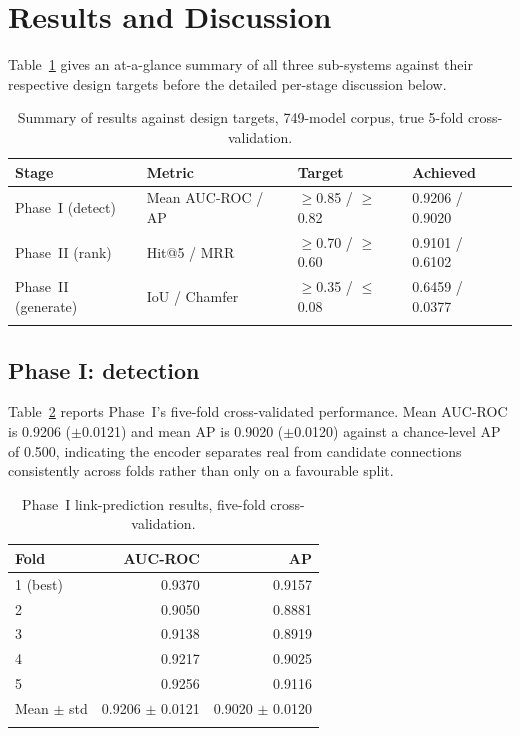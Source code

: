 \documentclass[sn-mathphys,Numbered]{sn-jnl}
\begin{document}
\section{Results and Discussion}\label{sec:results}

Table~\ref{tab:summary} gives an at-a-glance summary of all three sub-systems against their respective design targets before the detailed per-stage discussion below.

\begin{table}[h]
\caption{Summary of results against design targets, 749-model corpus, true 5-fold cross-validation.}\label{tab:summary}
\begin{tabular}{@{}llll@{}}
\toprule
Stage & Metric & Target & Achieved \\
\midrule
Phase~I (detect)   & Mean AUC-ROC / AP & $\geq$0.85 / $\geq$0.82 & 0.9206 / 0.9020 \\
Phase~II (rank)    & Hit@5 / MRR       & $\geq$0.70 / $\geq$0.60 & 0.9101 / 0.6102 \\
Phase~II (generate) & IoU / Chamfer     & $\geq$0.35 / $\leq$0.08 & 0.6459 / 0.0377 \\
\botrule
\end{tabular}
\end{table}

\subsection{Phase I: detection}\label{sec:results-phase1}

Table~\ref{tab:phase1} reports Phase~I's five-fold cross-validated performance. Mean AUC-ROC is 0.9206 ($\pm$0.0121) and mean AP is 0.9020 ($\pm$0.0120) against a chance-level AP of 0.500, indicating the encoder separates real from candidate connections consistently across folds rather than only on a favourable split.

\begin{table}[h]
\caption{Phase~I link-prediction results, five-fold cross-validation.}\label{tab:phase1}
\begin{tabular}{@{}lrr@{}}
\toprule
Fold & AUC-ROC & AP \\
\midrule
1 (best) & 0.9370 & 0.9157 \\
2        & 0.9050 & 0.8881 \\
3        & 0.9138 & 0.8919 \\
4        & 0.9217 & 0.9025 \\
5        & 0.9256 & 0.9116 \\
\midrule
Mean $\pm$ std & 0.9206 $\pm$ 0.0121 & 0.9020 $\pm$ 0.0120 \\
\botrule
\end{tabular}
\end{table}
\end{document}
